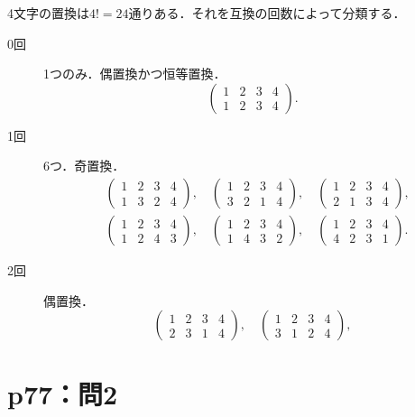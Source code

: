 \begin{tanswer}
  4文字の置換は$4!=24$通りある．それを互換の回数によって分類する．
  \begin{description}
    \item[0回] 1つのみ．偶置換かつ恒等置換．
          \[
            \begin{pmatrix} 1 & 2 & 3 &4 \\ 1 & 2 & 3 &4\end{pmatrix}.
          \]
    \item [1回] 6つ．奇置換．
          \begin{align*}
             & \begin{pmatrix} 1 & 2 & 3 & 4\\ 1 & 3 & 2 & 4\end{pmatrix},\quad
            \begin{pmatrix} 1 & 2 & 3 &4 \\ 3 & 2 & 1  & 4\end{pmatrix},\quad
            \begin{pmatrix} 1 & 2 & 3 & 4\\ 2 & 1 & 3 & 4\end{pmatrix},         \\
             & \begin{pmatrix} 1 & 2 & 3 & 4\\ 1 & 2 & 4 & 3\end{pmatrix},\quad
            \begin{pmatrix} 1 & 2 & 3 & 4\\ 1 & 4 & 3 & 2\end{pmatrix},\quad
            \begin{pmatrix} 1 & 2 & 3 & 4\\ 4 & 2 & 3 & 1\end{pmatrix}.
          \end{align*}
    \item [2回] 偶置換．
          \[
            \begin{pmatrix} 1 & 2 & 3 & 4 \\ 2 & 3 & 1 & 4\end{pmatrix},\quad
            \begin{pmatrix} 1 & 2 & 3 & 4 \\ 3 & 1 & 2 & 4 \end{pmatrix},
          \]
  \end{description}
\end{tanswer}

\section*{p77：問2}

